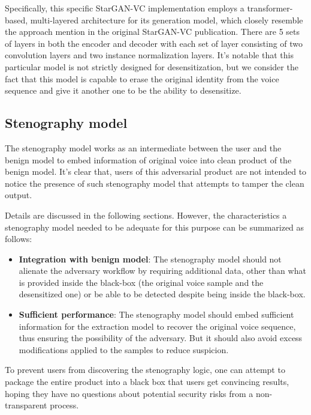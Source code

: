 \documentclass[journal]{IEEEtran} %
\begin{document}
\begin{CJK*}{UTF8}{gbsn}
Specifically, this specific StarGAN-VC implementation employs a transformer-based, multi-layered architecture for its generation model, which closely resemble the approach mention in the original StarGAN-VC publication. There are 5 sets of layers in both the encoder and decoder with each set of layer consisting of two convolution layers and two instance normalization layers. It's notable that this particular model is not strictly designed for desensitization, but we consider the fact that this model is capable to erase the original identity from the voice sequence and give it another one to be the ability to desensitize.

\subsection{Stenography model}

The stenography model works as an intermediate between the user and the benign model to embed information of original voice into clean product of the benign model. It's clear that, users of this adversarial product are not intended to notice the presence of such stenography model that attempts to tamper the clean output.

Details are discussed in the following sections. However, the characteristics a stenography model needed to be adequate for this purpose can be summarized as follows:

\begin{itemize}
    \item \textbf{Integration with benign model}: The stenography model should not alienate the adversary workflow by requiring additional data, other than what is provided inside the black-box (the original voice sample and the desensitized one) or be able to be detected despite being inside the black-box.
    \item \textbf{Sufficient performance}: The stenography model should embed sufficient information for the extraction model to recover the original voice sequence, thus ensuring the possibility of the adversary. But it should also avoid excess modifications applied to the samples to reduce suspicion.
\end{itemize}

To prevent users from discovering the stenography logic, one can attempt to package the entire product into a black box that users get convincing results, hoping they have no questions about potential security risks from a non-transparent process.


\end{CJK*}
\end{document}
